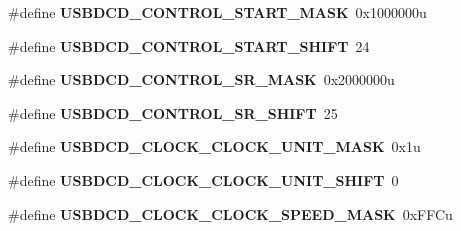 \begin{DoxyCompactItemize}
\item 
\hypertarget{group___u_s_b_d_c_d___register___masks_ga02bb74c9b2d9fd907d02b72ec4f2dc0c}{}\#define {\bfseries U\+S\+B\+D\+C\+D\+\_\+\+C\+O\+N\+T\+R\+O\+L\+\_\+\+S\+T\+A\+R\+T\+\_\+\+M\+A\+S\+K}~0x1000000u\label{group___u_s_b_d_c_d___register___masks_ga02bb74c9b2d9fd907d02b72ec4f2dc0c}

\item 
\hypertarget{group___u_s_b_d_c_d___register___masks_ga8a353cada7464a5898998c45b2caabb5}{}\#define {\bfseries U\+S\+B\+D\+C\+D\+\_\+\+C\+O\+N\+T\+R\+O\+L\+\_\+\+S\+T\+A\+R\+T\+\_\+\+S\+H\+I\+F\+T}~24\label{group___u_s_b_d_c_d___register___masks_ga8a353cada7464a5898998c45b2caabb5}

\item 
\hypertarget{group___u_s_b_d_c_d___register___masks_ga7455215193ec55d79026af2e09a7523f}{}\#define {\bfseries U\+S\+B\+D\+C\+D\+\_\+\+C\+O\+N\+T\+R\+O\+L\+\_\+\+S\+R\+\_\+\+M\+A\+S\+K}~0x2000000u\label{group___u_s_b_d_c_d___register___masks_ga7455215193ec55d79026af2e09a7523f}

\item 
\hypertarget{group___u_s_b_d_c_d___register___masks_ga122056290d48016111c0a5e3cb8b63c4}{}\#define {\bfseries U\+S\+B\+D\+C\+D\+\_\+\+C\+O\+N\+T\+R\+O\+L\+\_\+\+S\+R\+\_\+\+S\+H\+I\+F\+T}~25\label{group___u_s_b_d_c_d___register___masks_ga122056290d48016111c0a5e3cb8b63c4}

\item 
\hypertarget{group___u_s_b_d_c_d___register___masks_ga7c8eace6dde39098426fe04c6b32bf92}{}\#define {\bfseries U\+S\+B\+D\+C\+D\+\_\+\+C\+L\+O\+C\+K\+\_\+\+C\+L\+O\+C\+K\+\_\+\+U\+N\+I\+T\+\_\+\+M\+A\+S\+K}~0x1u\label{group___u_s_b_d_c_d___register___masks_ga7c8eace6dde39098426fe04c6b32bf92}

\item 
\hypertarget{group___u_s_b_d_c_d___register___masks_gae3126a9608c08fe560b91f7b742bb98a}{}\#define {\bfseries U\+S\+B\+D\+C\+D\+\_\+\+C\+L\+O\+C\+K\+\_\+\+C\+L\+O\+C\+K\+\_\+\+U\+N\+I\+T\+\_\+\+S\+H\+I\+F\+T}~0\label{group___u_s_b_d_c_d___register___masks_gae3126a9608c08fe560b91f7b742bb98a}

\item 
\hypertarget{group___u_s_b_d_c_d___register___masks_gaf53eaecf9a4de0251c8906350ac989ae}{}\#define {\bfseries U\+S\+B\+D\+C\+D\+\_\+\+C\+L\+O\+C\+K\+\_\+\+C\+L\+O\+C\+K\+\_\+\+S\+P\+E\+E\+D\+\_\+\+M\+A\+S\+K}~0x\+F\+F\+Cu\label{group___u_s_b_d_c_d___register___masks_gaf53eaecf9a4de0251c8906350ac989ae}


\end{DoxyCompactItemize}
